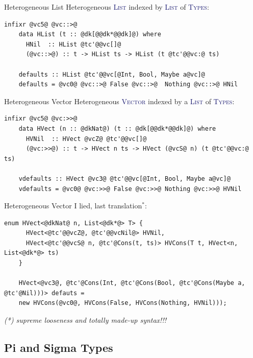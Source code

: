 \documentclass[xcolor={usenames,dvipsnames}]{beamer}
\newcommand{\htycon}[1]{\textcolor{MidnightBlue}{\textsc{#1}}}
\begin{document}
\begin{frame}[fragile]{Heterogeneous List}
  Heterogeneous \htycon{List} indexed by \htycon{List} of \htycon{Types}:
  \begin{lstlisting}[style=hask]
    infixr @vc5@ @vc::>@
    data HList (t :: @dk[@@dk*@@dk]@) where
      HNil  :: HList @tc'@@vc[]@
      (@vc::>@) :: t -> HList ts -> HList (t @tc'@@vc:@ ts)

    defaults :: HList @tc'@@vc[@Int, Bool, Maybe a@vc]@
    defaults = @vc0@ @vc::>@ False @vc::>@  Nothing @vc::>@ HNil
  \end{lstlisting}
\end{frame}

\begin{frame}[fragile]{Heterogeneous Vector}
  Heterogeneous \htycon{Vector} indexed by a \htycon{List} of \htycon{Types}:
  \begin{lstlisting}[style=hask]
    infixr @vc5@ @vc:>>@
    data HVect (n :: @dkNat@) (t :: @dk[@@dk*@@dk]@) where
      HVNil  :: HVect @vcZ@ @tc'@@vc[]@
      (@vc:>>@) :: t -> HVect n ts -> HVect (@vcS@ n) (t @tc'@@vc:@ ts)

    vdefaults :: HVect @vc3@ @tc'@@vc[@Int, Bool, Maybe a@vc]@
    vdefaults = @vc0@ @vc:>>@ False @vc:>>@ Nothing @vc:>>@ HVNil
  \end{lstlisting}
\end{frame}

\begin{frame}[fragile]{Heterogeneous Vector}
  I lied, last translation$^*$:
  \begin{lstlisting}[style=hask]
    enum HVect<@dkNat@ n, List<@dk*@> T> {
      HVect<@tc'@@vcZ@, @tc'@@vcNil@> HVNil,
      HVect<@tc'@@vcS@ n, @tc'@Cons(t, ts)> HVCons(T t, HVect<n, List<@dk*@> ts)
    }

    HVect<@vc3@, @tc'@Cons(Int, @tc'@Cons(Bool, @tc'@Cons(Maybe a, @tc'@Nil)))> defauts =
    new HVCons(@vc0@, HVCons(False, HVCons(Nothing, HVNil)));
  \end{lstlisting}
  \textit{\tiny{(*) supreme looseness and totally made-up syntax!!!}}
\end{frame}


\subsection{Pi and Sigma Types}
\end{document}
